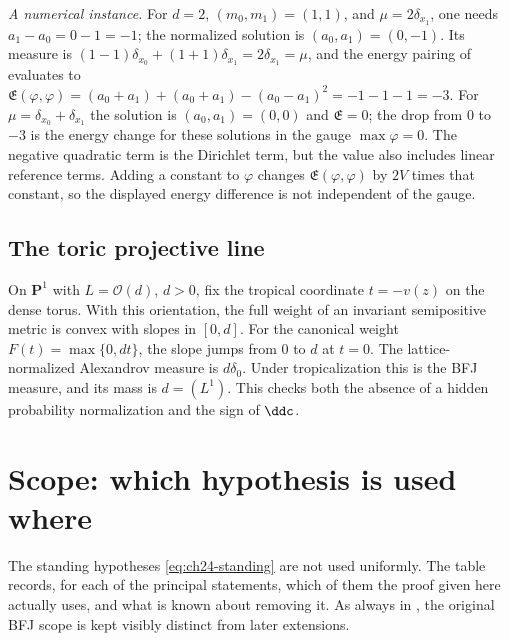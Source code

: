 \begin{example}
\emph{A numerical instance.}  For $d=2$, $(m_0,m_1)=(1,1)$, and
$\mu=2\delta_{x_1}$, one needs $a_1-a_0=0-1=-1$; the normalized solution
is $(a_0,a_1)=(0,-1)$.  Its measure is
$(1-1)\delta_{x_0}+(1+1)\delta_{x_1}=2\delta_{x_1}=\mu$, and the energy
pairing of  evaluates to
$\mathfrak E(\varphi,\varphi)=(a_0+a_1)+(a_0+a_1)-(a_0-a_1)^2
 =-1-1-1=-3$.
For $\mu=\delta_{x_0}+\delta_{x_1}$ the solution is
$(a_0,a_1)=(0,0)$ and $\mathfrak E=0$; the drop from $0$ to $-3$
is the energy change for these solutions in the gauge
$\max\varphi=0$.  The negative quadratic term is the Dirichlet term,
but the value also includes linear reference terms.  Adding a constant
to $\varphi$ changes $\mathfrak E(\varphi,\varphi)$ by $2V$ times that
constant, so the displayed energy difference is not independent of the
gauge.
\end{example}

\subsection{The toric projective line}
\label{sec:ch24-ex-toric-p1}

\begin{example}
\label{ex:ch24-toric-p1}
On $\mathbf P^1$ with $L=\mathcal O(d)$, $d>0$, fix the tropical
coordinate $t=-v(z)$ on the dense torus.  With this orientation, the
full weight of an invariant semipositive metric is convex with slopes in
$[0,d]$.  For the canonical weight $F(t)=\max\{0,dt\}$, the slope
jumps from $0$ to $d$ at $t=0$.  The lattice-normalized Alexandrov
measure is $d\delta_0$.
Under tropicalization this is the BFJ measure, and its mass is
$d=(L^1)$. This checks both the absence of a hidden probability
normalization and the sign of $\ddc$.
\end{example}

\section{Scope: which hypothesis is used where}
\label{sec:ch24-scope}

The standing hypotheses \eqref{eq:ch24-standing} are not used uniformly.  The
table records, for each of the principal statements, which of them the proof
given here actually uses, and what is known about removing it.  As always in
, the original BFJ scope is kept visibly distinct from later
extensions.

